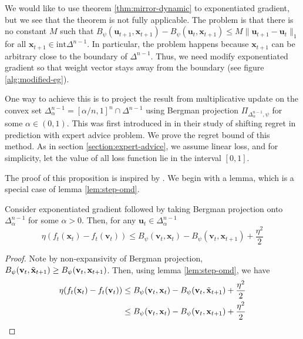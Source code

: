 \documentclass[12pt, a4paper]{report}
\begin{document}
We would like to use theorem \ref{thm:mirror-dynamic} to exponentiated gradient, but we see that the theorem is not fully applicable. The problem is that there is no constant $M$ such that $B_\psi(\mathbf{u}_{t+1}, \mathbf{x}_{t+1}) - B_\psi(\mathbf{u}_t, \mathbf{x}_{t+1}) \leq M \lVert \mathbf{u}_{t+1} - \mathbf{u}_t \rVert_1$ for all $\mathbf{x}_{t+1} \in \mathrm{int} \Delta^{n-1}$. In particular, the problem happens because $\mathbf{x}_{t+1}$ can be arbitrary close to the boundary of $\Delta^{n-1}$. Thus, we need modify exponentiated gradient so that weight vector stays away from the boundary (see figure \ref{alg:modified-eg}).

One way to achieve this is to project the result from multiplicative update on the convex set $\Delta_\alpha^{n-1} = [\alpha/n, 1]^{n} \cap \Delta^{n-1}$ using Bergman projection $\Pi_{\Delta_\alpha^{n-1}, \psi}$ for some $\alpha \in (0, 1)$.  This was first introduced in \cite{Herbster2001Tracking} in their study of shifting regret in prediction with expert advice problem. We prove the regret bound of this method. As in section \ref{section:expert-advice}, we assume linear loss, and for simplicity, let the value of all loss function lie in the interval $[0, 1]$.

The proof of this proposition is inspired by \cite{CesaBianchi2012MirrorDM}. We begin with a lemma, which is a special case of lemma \ref{lem:step-omd}.
\begin{lem} \label{lem:exp-modified-step}
Consider exponentiated gradient followed by taking Bergman projection onto $\Delta_\alpha^{n-1}$ for some $\alpha > 0$. Then, for any $\mathbf{u}_t \in \Delta_\alpha^{n-1}$
\begin{equation*}
    \eta(f_t(\mathbf{x}_t) - f_t(\mathbf{v}_t)) \leq B_\psi(\mathbf{v}_t, \mathbf{x}_t) - B_\psi(\mathbf{v}_t, \mathbf{x}_{t+1}) + \frac{\eta^2}{2}
\end{equation*}
\end{lem}
\begin{proof}
Note by non-expansivity of Bergman projection, 
$B_\psi(\mathbf{v}_t, \Tilde{\mathbf{x}}_{t+1}) \geq B_\psi(\mathbf{v}_t, \mathbf{x}_{t+1})$. Then, using lemma \ref{lem:step-omd}, we have
\begin{align*}
    \eta(f_t(\mathbf{x}_t) - f_t(\mathbf{v}_t)) &\leq B_\psi(\mathbf{v}_t, \mathbf{x}_t) - B_\psi(\mathbf{v}_t, \Tilde{\mathbf{x}}_{t+1}) + \frac{\eta^2}{2}
    \\
    &\leq B_\psi(\mathbf{v}_t, \mathbf{x}_t) - B_\psi(\mathbf{v}_t, \mathbf{x}_{t+1}) + \frac{\eta^2}{2} \qedhere
\end{align*} 
\end{proof}
\end{document}
